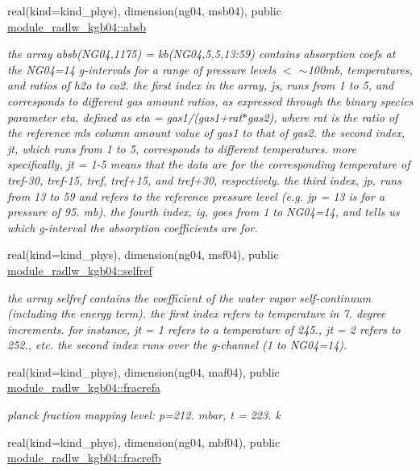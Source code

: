 \begin{DoxyCompactItemize}
real(kind=kind\+\_\+phys), dimension(ng04, msb04), public \hyperlink{group__module__radlw__kgbnn_gaaacc55911b42c67396b5cdc4318e0d5f}{module\+\_\+radlw\+\_\+kgb04\+::absb}
\begin{DoxyCompactList}\small\item\em the array absb(\+N\+G04,1175) = kb(\+N\+G04,5,5,13\+:59) contains absorption coefs at the N\+G04=14 g-\/intervals for a range of pressure levels $<$ $\sim$100mb, temperatures, and ratios of h2o to co2. the first index in the array, js, runs from 1 to 5, and corresponds to different gas amount ratios, as expressed through the binary species parameter eta, defined as eta = gas1/(gas1+rat$\ast$gas2), where rat is the ratio of the reference mls column amount value of gas1 to that of gas2. the second index, jt, which runs from 1 to 5, corresponds to different temperatures. more specifically, jt = 1-\/5 means that the data are for the corresponding temperature of tref-\/30, tref-\/15, tref, tref+15, and tref+30, respectively. the third index, jp, runs from 13 to 59 and refers to the reference pressure level (e.\+g. jp = 13 is for a pressure of 95. mb). the fourth index, ig, goes from 1 to N\+G04=14, and tells us which g-\/interval the absorption coefficients are for. \end{DoxyCompactList}\item 
real(kind=kind\+\_\+phys), dimension(ng04, msf04), public \hyperlink{group__module__radlw__kgbnn_ga696b91ef86ccbda17df10f770797cafa}{module\+\_\+radlw\+\_\+kgb04\+::selfref}
\begin{DoxyCompactList}\small\item\em the array selfref contains the coefficient of the water vapor self-\/continuum (including the energy term). the first index refers to temperature in 7. degree increments. for instance, jt = 1 refers to a temperature of 245., jt = 2 refers to 252., etc. the second index runs over the g-\/channel (1 to N\+G04=14). \end{DoxyCompactList}\item 
real(kind=kind\+\_\+phys), dimension(ng04, maf04), public \hyperlink{group__module__radlw__kgbnn_gace1d87742e2c543d9b0662e1c7d2b624}{module\+\_\+radlw\+\_\+kgb04\+::fracrefa}
\begin{DoxyCompactList}\small\item\em planck fraction mapping level\+: p=212. mbar, t = 223. k \end{DoxyCompactList}\item 
real(kind=kind\+\_\+phys), dimension(ng04, mbf04), public \hyperlink{group__module__radlw__kgbnn_gae8d5d56d09dfbe06d918c6b098e3fddf}{module\+\_\+radlw\+\_\+kgb04\+::fracrefb}

\end{DoxyCompactItemize}
